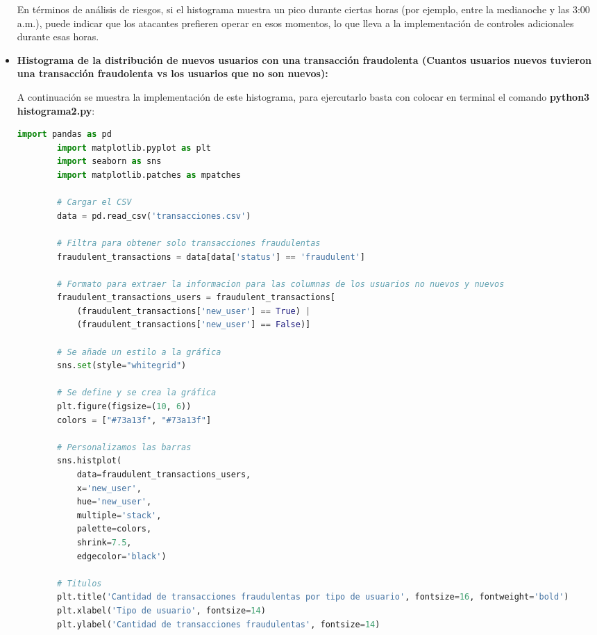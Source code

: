 \documentclass{article}
\begin{document}
\begin{itemize}
        En términos de análisis de riesgos, si el histograma muestra un pico durante ciertas horas (por ejemplo, entre la medianoche y las 3:00 a.m.), puede indicar que los atacantes prefieren operar en esos momentos, lo que lleva a la implementación de controles adicionales durante esas horas.

    \item \textbf{Histograma de la distribución de nuevos usuarios con una transacción fraudolenta (Cuantos usuarios nuevos tuvieron una transacción fraudolenta vs los usuarios que no son nuevos):}

    A continuación se muestra la implementación de este histograma, para ejercutarlo basta con colocar en terminal el comando \textbf{python3 histograma2.py}:

    \begin{lstlisting}[language=Python, caption=Implementación DES(Data Encryption Standard)]
        import pandas as pd
        import matplotlib.pyplot as plt
        import seaborn as sns
        import matplotlib.patches as mpatches
        
        # Cargar el CSV
        data = pd.read_csv('transacciones.csv')
        
        # Filtra para obtener solo transacciones fraudulentas
        fraudulent_transactions = data[data['status'] == 'fraudulent']
        
        # Formato para extraer la informacion para las columnas de los usuarios no nuevos y nuevos
        fraudulent_transactions_users = fraudulent_transactions[
            (fraudulent_transactions['new_user'] == True) | 
            (fraudulent_transactions['new_user'] == False)]
        
        # Se añade un estilo a la gráfica
        sns.set(style="whitegrid")
        
        # Se define y se crea la gráfica
        plt.figure(figsize=(10, 6)) 
        colors = ["#73a13f", "#73a13f"]
        
        # Personalizamos las barras
        sns.histplot(
            data=fraudulent_transactions_users, 
            x='new_user', 
            hue='new_user',  
            multiple='stack', 
            palette=colors,
            shrink=7.5,  
            edgecolor='black')
        
        # Titulos
        plt.title('Cantidad de transacciones fraudulentas por tipo de usuario', fontsize=16, fontweight='bold')
        plt.xlabel('Tipo de usuario', fontsize=14)
        plt.ylabel('Cantidad de transacciones fraudulentas', fontsize=14)
        

\end{lstlisting}
\end{itemize}
\end{document}
